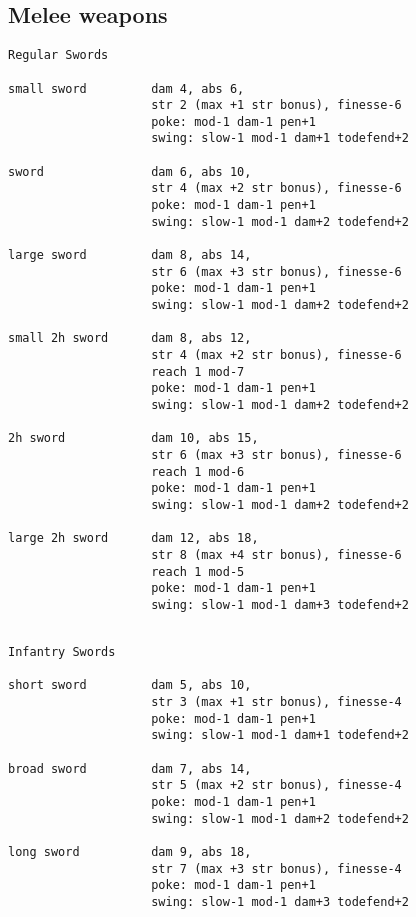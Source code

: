 \subsection*{Melee weapons}
\small
\begin{verbatim}
Regular Swords

small sword         dam 4, abs 6,
                    str 2 (max +1 str bonus), finesse-6
                    poke: mod-1 dam-1 pen+1
                    swing: slow-1 mod-1 dam+1 todefend+2

sword               dam 6, abs 10,
                    str 4 (max +2 str bonus), finesse-6
                    poke: mod-1 dam-1 pen+1
                    swing: slow-1 mod-1 dam+2 todefend+2

large sword         dam 8, abs 14,
                    str 6 (max +3 str bonus), finesse-6
                    poke: mod-1 dam-1 pen+1
                    swing: slow-1 mod-1 dam+2 todefend+2

small 2h sword      dam 8, abs 12,
                    str 4 (max +2 str bonus), finesse-6
                    reach 1 mod-7
                    poke: mod-1 dam-1 pen+1
                    swing: slow-1 mod-1 dam+2 todefend+2

2h sword            dam 10, abs 15,
                    str 6 (max +3 str bonus), finesse-6
                    reach 1 mod-6
                    poke: mod-1 dam-1 pen+1
                    swing: slow-1 mod-1 dam+2 todefend+2

large 2h sword      dam 12, abs 18,
                    str 8 (max +4 str bonus), finesse-6
                    reach 1 mod-5
                    poke: mod-1 dam-1 pen+1
                    swing: slow-1 mod-1 dam+3 todefend+2


\end{verbatim} \goodbreak \begin{verbatim}
Infantry Swords

short sword         dam 5, abs 10,
                    str 3 (max +1 str bonus), finesse-4
                    poke: mod-1 dam-1 pen+1
                    swing: slow-1 mod-1 dam+1 todefend+2

broad sword         dam 7, abs 14,
                    str 5 (max +2 str bonus), finesse-4
                    poke: mod-1 dam-1 pen+1
                    swing: slow-1 mod-1 dam+2 todefend+2

long sword          dam 9, abs 18,
                    str 7 (max +3 str bonus), finesse-4
                    poke: mod-1 dam-1 pen+1
                    swing: slow-1 mod-1 dam+3 todefend+2



\end{verbatim}
